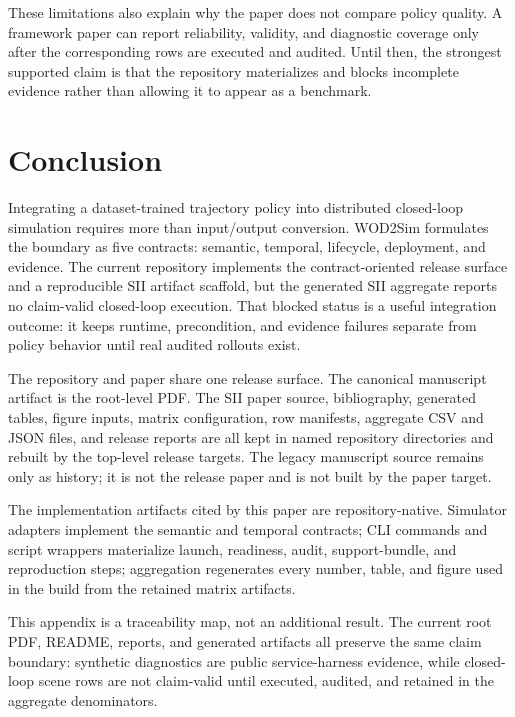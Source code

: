 \documentclass[conference,a4paper]{IEEEtran}
\begin{document}
These limitations also explain why the paper does not compare policy quality. A
framework paper can report reliability, validity, and diagnostic coverage only after the
corresponding rows are executed and audited. Until then, the strongest supported claim is
that the repository materializes and blocks incomplete evidence rather than allowing it
to appear as a benchmark.

\section{Conclusion}

Integrating a dataset-trained trajectory policy into distributed closed-loop simulation
requires more than input/output conversion. WOD2Sim formulates the boundary as five
contracts: semantic, temporal, lifecycle, deployment, and evidence. The current
repository implements the contract-oriented release surface and a reproducible SII
artifact scaffold, but the generated SII aggregate reports no claim-valid closed-loop
execution. That blocked status is a useful integration outcome: it keeps runtime,
precondition, and evidence failures separate from policy behavior until real audited
rollouts exist.


The repository and paper share one release surface. The canonical manuscript artifact is
the root-level PDF. The SII paper source, bibliography, generated tables, figure inputs,
matrix configuration, row manifests, aggregate CSV and JSON files, and release reports
are all kept in named repository directories and rebuilt by the top-level release
targets. The legacy manuscript source remains only as history; it is not the release
paper and is not built by the paper target.

The implementation artifacts cited by this paper are repository-native. Simulator
adapters implement the semantic and temporal contracts; CLI commands and script wrappers
materialize launch, readiness, audit, support-bundle, and reproduction steps; aggregation
regenerates every number, table, and figure used in the build from the retained matrix
artifacts.

This appendix is a traceability map, not an additional result. The current root PDF,
README, reports, and generated artifacts all preserve the same claim boundary: synthetic
diagnostics are public service-harness evidence, while closed-loop scene rows are not
claim-valid until executed, audited, and retained in the aggregate denominators.
\end{document}
